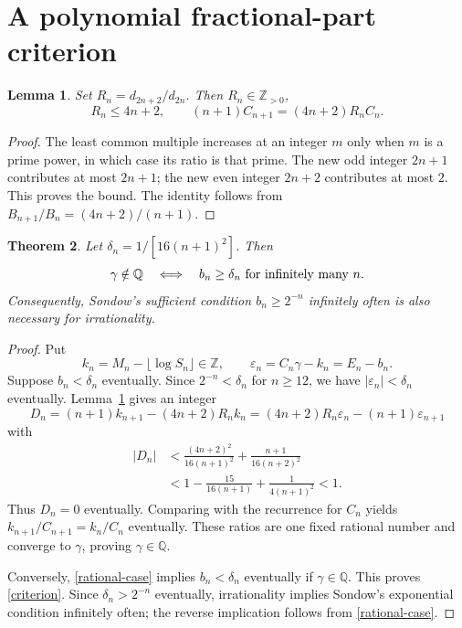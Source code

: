 \documentclass[11pt,a4paper]{article}
\newtheorem{theorem}{Theorem}[section]
\newtheorem{lemma}[theorem]{Lemma}
\theoremstyle{remark}\newtheorem{remark}[theorem]{Remark}
\newcommand{\Q}{\mathbb Q}\newcommand{\Z}{\mathbb Z}
\begin{document}
\section{A polynomial fractional-part criterion}
\begin{lemma}\label{lcm-ratio}
Set $R_n=d_{2n+2}/d_{2n}$. Then $R_n\in\Z_{>0}$,
\[
 R_n\le4n+2,\qquad (n+1)C_{n+1}=(4n+2)R_nC_n.
\]
\end{lemma}
\begin{proof}
The least common multiple increases at an integer $m$ only when $m$ is a prime
power, in which case its ratio is that prime. The new odd integer $2n+1$
contributes at most $2n+1$; the new even integer $2n+2$ contributes at most $2$.
This proves the bound. The identity follows from
$B_{n+1}/B_n=(4n+2)/(n+1)$.
\end{proof}

\begin{theorem}\label{poly-criterion}
Let $\delta_n=1/[16(n+1)^2]$. Then
\begin{equation}
 \gamma\notin\Q
 \quad\Longleftrightarrow\quad
 b_n\ge\delta_n\ \hbox{for infinitely many }n.\label{criterion}
\end{equation}
Consequently, Sondow's sufficient condition $b_n\ge2^{-n}$ infinitely often
is also necessary for irrationality.
\end{theorem}
\begin{proof}
Put
\[
 k_n=M_n-\lfloor\log S_n\rfloor\in\Z,\qquad
 \varepsilon_n=C_n\gamma-k_n=E_n-b_n.
\]
Suppose $b_n<\delta_n$ eventually. Since $2^{-n}<\delta_n$ for $n\ge12$,
we have $|\varepsilon_n|<\delta_n$ eventually. Lemma~\ref{lcm-ratio} gives an integer
\[
 D_n=(n+1)k_{n+1}-(4n+2)R_nk_n
     =(4n+2)R_n\varepsilon_n-(n+1)\varepsilon_{n+1}
\]
with
\begin{align*}
 |D_n|&<\frac{(4n+2)^2}{16(n+1)^2}
                +\frac{n+1}{16(n+2)^2}\\
 &<1-\frac{15}{16(n+1)}+\frac1{4(n+1)^2}<1.
\end{align*}
Thus $D_n=0$ eventually. Comparing with the recurrence for $C_n$ yields
$k_{n+1}/C_{n+1}=k_n/C_n$ eventually. These ratios are one fixed rational
number and converge to $\gamma$, proving $\gamma\in\Q$.

Conversely, \eqref{rational-case} implies $b_n<\delta_n$ eventually if
$\gamma\in\Q$. This proves \eqref{criterion}. Since
$\delta_n>2^{-n}$ eventually, irrationality implies Sondow's exponential
condition infinitely often; the reverse implication follows from
\eqref{rational-case}.
\end{proof}
\end{document}
